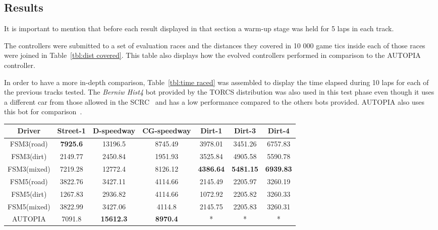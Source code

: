 	
\subsection{Results} \label{subsec:Results}
	
	It is important to mention that before each result displayed in that section a warm-up stage was held for 5 laps in each track.
	
	The controllers were submitted to a set of evaluation races and the distances they covered in 10 000 game tics inside each of those races were joined in Table~\ref{tbl:dist covered}. This table also displays how the evolved controllers performed in comparison to the AUTOPIA controller.
	
	In order to have a more in-depth comparison, Table~\ref{tbl:time raced} was assembled to display the time elapsed during 10 laps for each of the previous tracks tested. The \textit{Berniw Hist4} bot provided by the TORCS distribution was also used in this test phase even though it uses a different car from those allowed in the SCRC~\cite{2009} and has a low performance compared to the others bots provided. AUTOPIA also uses this bot for comparison~\cite{AUTOPIA}.
	
	\begin{table*}[t]
	\renewcommand{\arraystretch}{1.3}
	\caption{Distance covered in meters racing alone for 10 000 game tics}
	\label{tbl:dist covered}
	\centering
	\begin{tabular}{c||c||c||c||c||c||c}
	\hline
	\bfseries Driver & \bfseries Street-1 & \bfseries D-speedway & \bfseries CG-speedway & \bfseries Dirt-1 & \bfseries Dirt-3 & \bfseries Dirt-4 \\ 
	\hline	
	\hline FSM3(road) & \textbf{7925.6} & 13196.5 & 8745.49 & 3978.01 & 3451.26 & 6757.83 \\
	\hline FSM3(dirt) & 2149.77	& 2450.84 & 1951.93	& 3525.84 & 4905.58 & 5590.78 \\
	\hline FSM3(mixed) & 7219.28 & 12772.4 & 8126.12 & \textbf{4386.64} & \textbf{5481.15} & \textbf{6939.83} \\
	\hline FSM5(road) & 3822.76 & 3427.11 & 4114.66	& 2145.49 &	2205.97 & 3260.19 \\
	\hline FSM5(dirt) & 1267.83 & 2936.82 &	4114.66 & 1072.92 &	2205.82 & 3260.33 \\
	\hline FSM5(mixed) & 3822.99 & 3427.06 & 4114.8 & 2145.75 &	2205.83 & 3260.31 \\
	\hline AUTOPIA & 7091.8 & \textbf{15612.3} & \textbf{8970.4} & * & * & * \\
	\hline 
	\end{tabular} 
	\end{table*}


